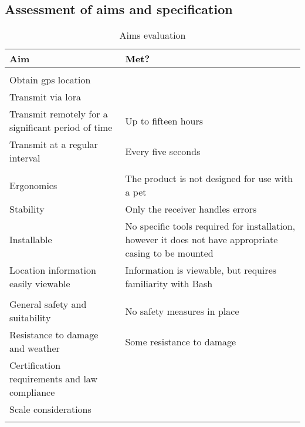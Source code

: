 \subsection{Assessment of aims and specification}

{\small
\begin{xltabular}{\linewidth}{|>{\raggedright\arraybackslash}p{4.5cm}|>{\color{white}}Z|}
    \hline
    Aim & \textcolor{black}{Met?} \\
    \hline
    \endhead
    \endfoot

     \\
    \hline
    Obtain \acrshort{gps} location &  \\ \hline
    Transmit via \gls{lora} &  \\ \hline
    Transmit remotely for a significant period of time & Up to fifteen hours \\ \hline
    Transmit at a regular interval & Every five seconds \\ \hline
    

     \\
    \hline
    Ergonomics & The product is not designed for use with a pet \\ \hline
    Stability & Only the receiver handles errors\\ \hline
    Installable & No specific tools required for installation, however 
        it does not have appropriate casing to be mounted \\ \hline
    Location information easily viewable & Information is viewable, but requires familiarity 
        with Bash \\ \hline
    

     \\
    \hline
    General safety and suitability & No safety measures in place \\ \hline
    Resistance to damage and weather & Some resistance to damage \\ \hline
    Certification requirements and law compliance &  \\ \hline
    Scale considerations &  \\ \hline
    
    \caption{Aims evaluation}\label{table:aimseval}
\end{xltabular}
\vspace{-11pt}
}

